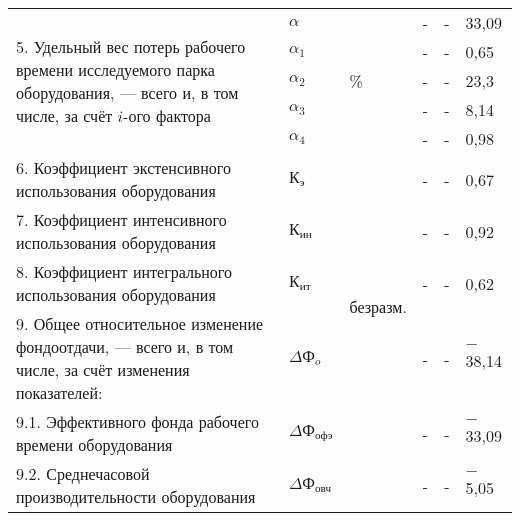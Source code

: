 \begin{table}[h!]
{\begin{tabular}{| p{} | p{} | p{} | p{} | p{} | p{} |}
      \multirow{5}{0.35\textwidth}{5. Удельный вес потерь рабочего времени исследуемого парка оборудования, --- всего и, в том числе, за счёт $i$-ого фактора} & $ \alpha $   & \multirow{5}{*}{\%} & - & - & 33,09 \\
                                               & $ \alpha_1 $ & & - & - & 0,65 \\
                                               & $ \alpha_2 $ & & - & - & 23,3 \\
                                               & $ \alpha_3 $ & & - & - & 8,14 \\
                                               & $ \alpha_4 $ & & - & - & 0,98 \\ \hline

      6. Коэффициент экстенсивного использования оборудования & $ \text{К}_{\text{э}} $ & \multirow{5}{*}{безразм.} & - & - & 0,67 \\ \cline{1-2}\cline{4-6}

      7. Коэффициент интенсивного использования оборудования & $ \text{К}_{\text{ин}} $ & & - & - & 0,92 \\ \cline{1-2}\cline{4-6}

      8. Коэффициент интегрального использования оборудования & $ \text{К}_{\text{ит}} $ & & - & - & 0,62 \\ \hline

      9. Общее относительное изменение фондоотдачи, --- всего и, в том числе, за счёт изменения показателей: & $ \Delta \text{Ф}_o $ & \multirow{6}{*}{\%} & - & - & $-$38,14 \\ \cline{1-2}\cline{4-6}

      9.1. Эффективного фонда рабочего времени оборудования & $ \Delta \text{Ф}_{\text{офэ}} $ & & - & - & $-$33,09 \\ \cline{1-2}\cline{4-6}

      9.2. Среднечасовой производительности оборудования & $ \Delta \text{Ф}_{\text{овч}} $ & & - & - & $-$5,05 \\ \hline
    \end{tabular}
  }
\end{table}

\newpage
